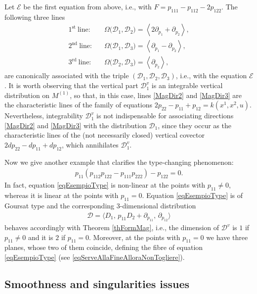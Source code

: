 \documentclass[pdftex]{sigma}
\newcommand{\D}{\mathcal{D}}
\newcommand{\E}{\mathcal{E}}
\newcommand{\Span}[1]{\left\langle #1 \right\rangle}
\newcommand{\St}{^\textrm{st}}
\newcommand{\Rd}{^\textrm{rd}}
\newcommand{\Nd}{^\textrm{nd}}
\numberwithin{equation}{section}
\begin{document}
Let $\E$ be the f\/irst equation from above, i.e., with $F=p_{111}-p_{112}-2p_{122}$. The following three lines
 \begin{align}
1\St \ \textrm{line:} \quad & \Omega\big(\D_1,\D_2)=\Span{ 2\partial_{p_1}+\partial_{p_2}},\\
2\Nd \ \textrm{line:} \quad & \Omega\big(\D_1,\D_3)=\Span{ \partial_{p_1}-\partial_{p_2}},\label{MagDir2}\\
3\Rd \ \textrm{line:} \quad & \Omega\big(\D_2,\D_3)=\Span{ \partial_{p_2}},\label{MagDir3}
\end{align}
 are canonically associated with the triple $(\D_1,\D_2,\D_3)$, i.e., with the equation $\E$. It is worth observing that the vertical part $\D_1^v$ is an integrable vertical distribution on $M^{(1)}$, so that, in this case, lines \eqref{MagDir2} and \eqref{MagDir3} are the characteristic lines of the family of equations $2p_{22}-p_{11}+p_{12}=k(x^1,x^2,u)$.
Nevertheless, integrability $\D_1^v$ is not indispensable for associating directions \eqref{MagDir2} and \eqref{MagDir3} with the distribution $\D_1$, since they occur as the characteristic lines
of the (not necessarily closed) vertical covector $2dp_{22}-dp_{11}+dp_{12}$,
which annihilates $\D_1^v$.

Now we give another example that clarif\/ies the type-changing phenomenon:
\begin{gather}\label{eqEsempioType}
p_{11}(p_{112}p_{122}-p_{111}p_{222})-p_{122}=0 .
\end{gather}
In fact, equation \eqref{eqEsempioType} is non-linear at the points with $p_{11}\neq 0$, whereas it is linear at the points with $p_{11}=0$. Equation \eqref{eqEsempioType} is of Goursat type and the corresponding $3$-dimensional distribution
\begin{gather*}
\mathcal{D}=\langle D_1,\,p_{11}D_2+\partial_{p_{11}},\,\partial_{p_{12}} \rangle
\end{gather*}
behaves accordingly with Theorem \ref{thFormMag}, i.e., the dimension of $\mathcal{D}^v$ is $1$ if $p_{11}\neq 0$ and it is $2$ if $p_{11}=0$. Moreover, at the points with $p_{11}=0$ we have three planes, whose two of them coincide, def\/ining the f\/ibre of equation \eqref{eqEsempioType} (see \eqref{eqServeAllaFineAlloraNonTogliere}).

\subsection{Smoothness and singularities issues}\label{sezChiarificatrice}
\end{document}
